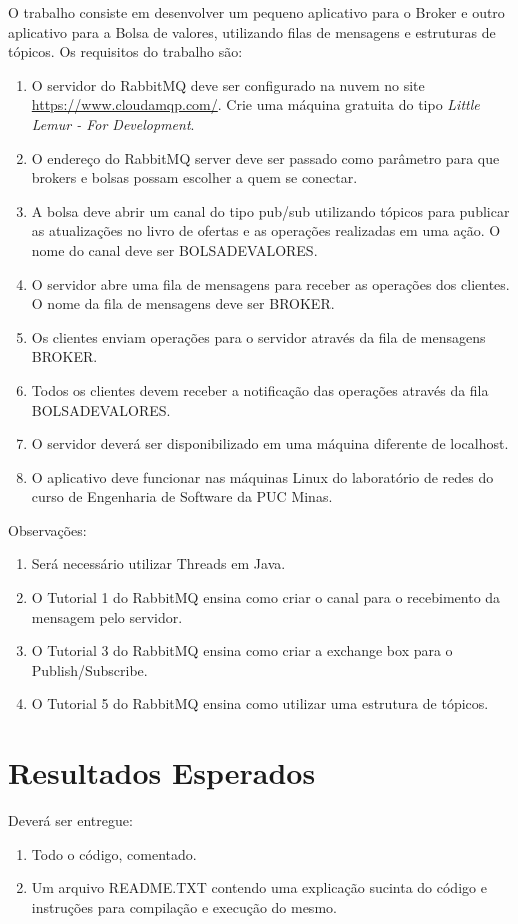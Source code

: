 \documentclass[12pt,brazil, a4paper, fullpage]{article}
\begin{document}
O trabalho consiste em desenvolver um pequeno aplicativo para o Broker e outro aplicativo para a Bolsa de valores, utilizando filas de mensagens e estruturas de tópicos. Os requisitos do trabalho são:

\begin{enumerate}
    \item O servidor do RabbitMQ deve ser configurado na nuvem no site \url{https://www.cloudamqp.com/}.
    Crie uma máquina gratuita do tipo \textit{Little Lemur - For Development}.
    \item O endereço do RabbitMQ server deve ser passado como parâmetro para que brokers e bolsas possam escolher a quem se conectar.
    \item A bolsa deve abrir um canal do tipo pub/sub utilizando tópicos para publicar as atualizações no livro de ofertas e as operações realizadas em uma ação. O nome do canal deve ser BOLSADEVALORES.
    \item O servidor abre uma fila de mensagens para receber as operações dos clientes. O nome da fila de mensagens deve ser BROKER.
    \item Os clientes enviam operações para o servidor através da fila de mensagens BROKER.
    \item Todos os clientes devem receber a notificação das operações através da fila BOLSADEVALORES.
    \item O servidor deverá ser disponibilizado em uma máquina diferente de localhost.
    \item O aplicativo deve funcionar nas máquinas Linux do laboratório de redes do curso de Engenharia de Software da PUC Minas.
\end{enumerate}

Observações:
\begin{enumerate}
    \item Será necessário utilizar Threads em Java.
    \item O Tutorial 1 do RabbitMQ ensina como criar o canal para o recebimento da mensagem pelo servidor.
    \item O Tutorial 3 do RabbitMQ ensina como criar a exchange box para o Publish/Subscribe.
    \item O Tutorial 5 do RabbitMQ ensina como utilizar uma estrutura de tópicos.
\end{enumerate}


\section{Resultados Esperados}

Deverá ser entregue:

\begin{enumerate}
    \item Todo o código, comentado.

    \item Um arquivo README.TXT contendo uma explicação sucinta do código e instruções para compilação e execução do mesmo.
\end{enumerate}
\end{document}
